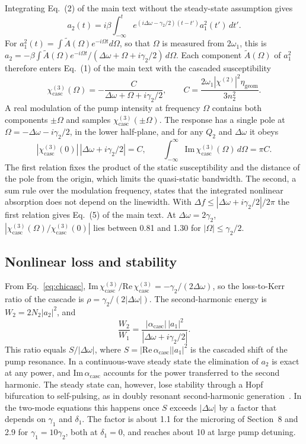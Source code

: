 \documentclass[9pt]{osa-supplemental-document}
\newcommand{\chitwo}{\chi^{(2)}}
\newcommand{\chicasc}{\chi^{(3)}_{\mathrm{casc}}}
\newcommand{\Dom}{\Delta\omega}
\newcommand{\etag}{\eta_{\mathrm{geom}}}
\newcommand{\acasc}{\alpha_{\mathrm{casc}}}
\begin{document}
Integrating Eq.~(2) of the main text without the steady-state assumption
gives
\begin{equation}
  a_2(t)=i\beta\int_{-\infty}^{t}e^{(i\Dom-\gamma_2/2)(t-t')}a_1^2(t')\,dt' .
\end{equation}
For $a_1^2(t)=\int\tilde A(\Omega)e^{-i\Omega t}d\Omega$, so that $\Omega$
is measured from $2\omega_1$, this is
$a_2=-\beta\int\tilde A(\Omega)e^{-i\Omega t}/(\Dom+\Omega+i\gamma_2/2)\,d\Omega$.
Each component $\tilde A(\Omega)$ of $a_1^2$ therefore enters Eq.~(1) of
the main text with the cascaded susceptibility
\begin{equation}
  \chicasc(\Omega)=-\frac{C}{\Dom+\Omega+i\gamma_2/2},\qquad
  C=\frac{2\omega_1|\chitwo|^2\etag}{3n_2^2}.
  \label{eq:response}
\end{equation}
A real modulation of the pump intensity at frequency $\Omega$ contains both
components $\pm\Omega$ and samples $\chicasc(\pm\Omega)$.  The response has
a single pole at $\Omega=-\Dom-i\gamma_2/2$, in the lower half-plane, and
for any $Q_2$ and $\Dom$ it obeys
\begin{equation}
  |\chicasc(0)|\,|\Dom+i\gamma_2/2|=C,\qquad
  \int_{-\infty}^{\infty}\mathrm{Im}\,\chicasc(\Omega)\,d\Omega=\pi C .
  \label{eq:sum}
\end{equation}
The first relation fixes the product of the static susceptibility and the
distance of the pole from the origin, which limits the quasi-static
bandwidth.  The second, a sum rule over the modulation frequency, states
that the integrated nonlinear absorption does not depend on the
linewidth.  With
$\Delta f\le|\Dom+i\gamma_2/2|/2\pi$ the first relation gives Eq.~(5) of
the main text.  At $\Dom=2\gamma_2$, $|\chicasc(\Omega)/\chicasc(0)|$ lies
between 0.81 and 1.30 for $|\Omega|\le\gamma_2/2$.

\subsection{Nonlinear loss and stability}

From Eq.~\eqref{eq:chicasc},
$\mathrm{Im}\,\chicasc/\mathrm{Re}\,\chicasc=-\gamma_2/(2\Dom)$, so the
loss-to-Kerr ratio of the cascade is $\rho=\gamma_2/(2|\Dom|)$.  The
second-harmonic energy is $W_2=2N_2|a_2|^2$, and
\begin{equation}
  \frac{W_2}{W_1}=\frac{|\acasc|\,|a_1|^2}{|\Dom+i\gamma_2/2|}.
\end{equation}
This ratio equals $S/|\Dom|$, where $S=|\mathrm{Re}\,\acasc||a_1|^2$ is the
cascaded shift of the pump resonance.  In a continuous-wave steady state
the elimination of $a_2$ is exact at any power, and $\mathrm{Im}\,\acasc$
accounts for the power transferred to the second harmonic.  The steady
state can, however, lose stability through a Hopf bifurcation to
self-pulsing, as in doubly resonant second-harmonic
generation~\cite{drummond1980}.  In the two-mode equations this happens once
$S$ exceeds $|\Dom|$ by a factor that depends on $\gamma_1$ and $\delta_1$.
The factor is about 1.1 for the microring of Section~8 and 2.9 for
$\gamma_1=10\gamma_2$, both at $\delta_1=0$, and reaches about 10 at large
pump detuning.
\end{document}
